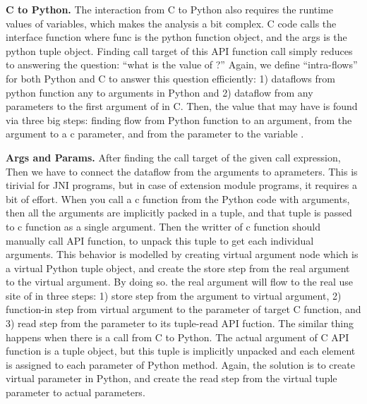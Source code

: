 \medskip
\textbf{C to Python.} The interaction from C to Python also requires
the runtime values of variables, which makes the analysis a bit complex. 
C code calls the interface function 
where func is the python function object, and the args is the python tuple
object. Finding call target of this API function call simply reduces to answering the
question: ``what is the value of ?'' Again, we define
``intra-flows'' for both Python and C to answer this question efficiently: 1) dataflows from 
python function any to arguments in Python and 2) dataflow from any parameters to the first argument of
 in C. Then, the value that  may have
is found via three big steps: finding flow from Python function to an argument, from the argument to
a c parameter, and from the parameter to the variable .

\textbf{Args and Params.} After finding the call target of the given call
expression, Then we have to connect the dataflow from the arguments to
aprameters.  This is tirivial for JNI programs, but in case of extension module
programs, it requires a bit of effort. When you call a c function from the
Python code with arguments, then all the arguments are implicitly packed in a
tuple, and that tuple is passed to c function as a single argument. Then the
writter of c function should manually call API function,
 to unpack this tuple to get each individual
arguments. This behavior is modelled by creating virtual argument node which is
a virtual Python tuple object, and create the store step from the real argument
to the virtual argument.  By doing so. the real argument will flow to the real
use site of in three steps: 1) store step from the argument to virtual
argument, 2) function-in step from virtual argument to the parameter of target
C function, and 3) read step from the parameter to its tuple-read API fuction.
The similar thing happens when there is a call from C to Python. The actual
argument of C API function is a tuple object, but this tuple is implicitly
unpacked and each element is assigned to each parameter of Python method.
Again, the solution is to create virtual parameter in Python, and create the
read step from the virtual tuple parameter to actual parameters.
